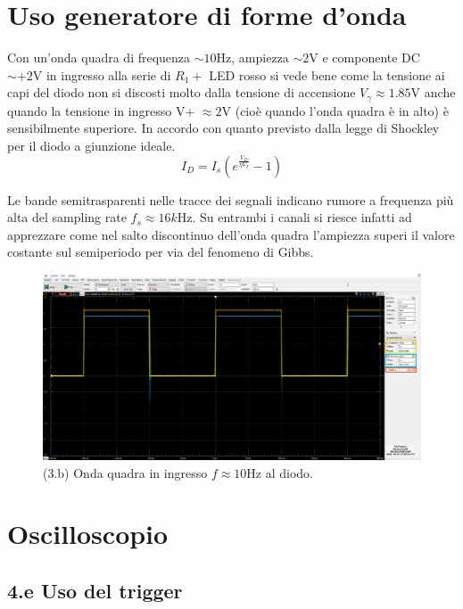 \documentclass[10pt, a4paper, italian]{article}
\begin{document}
\section{Uso generatore di forme d'onda}
Con un'onda quadra di frequenza $\sim 10 \si{\Hz}$, ampiezza $\sim 2 \si{\V}$
e componente DC $\sim + 2 \si{\V}$ in ingresso alla serie di $R_1 +$ LED
rosso si vede bene come la tensione ai capi del diodo non si discosti
molto dalla tensione di accensione $V_\gamma \approx 1.85 \si{\V}$ anche
quando la tensione in ingresso V+ $\approx 2 \si{\V}$ (cioè quando l'onda
quadra è in alto) è sensibilmente superiore. In accordo con quanto previsto
dalla legge di Shockley per il diodo a giunzione ideale.
\begin{equation}\label{eq:shockley}
I_D = I_s \left(e^{\frac{V_D}{\eta V_T}} - 1 \right)
\end{equation}

Le bande semitrasparenti nelle tracce dei segnali indicano rumore a frequenza
più alta del sampling rate $f_s \approx 16 \si{k\Hz}$. Su entrambi i canali
si riesce infatti ad apprezzare come nel salto discontinuo dell'onda quadra
l'ampiezza superi il valore costante sul semiperiodo per via del fenomeno di
Gibbs. 

\begin{figure}[htb]
\centering
\includegraphics[scale=0.3]{sqwdiode}
\caption{(3.b) Onda quadra in ingresso $f \approx 10 \si{\Hz}$ al diodo.}
\end{figure}
\section{Oscilloscopio}

\subsection*{4.e Uso del trigger}
\end{document}
